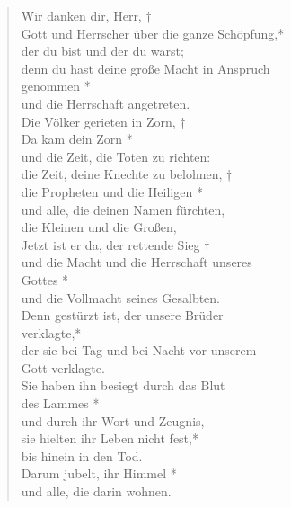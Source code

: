 \vspace{0.3cm}

\def\greinitialformat#1{{\fontsize{40}{40}\selectfont #1}}
\gresetfirstlineaboveinitial{\small \textcolor{red}{Ap 11;12}}{}
\setaboveinitialseparation{0.72mm}




\begin{verse}
 Wir danken dir, Herr, †\\
 Gott und Herrscher über die ganze Schöpfung,*\\
 der du bist und der du warst;\\
 \vin denn du hast deine große Macht in Anspruch\\ \vin  genommen *\\
 \vin und die Herrschaft angetreten. \\
 Die Völker gerieten in Zorn, †\\
 Da kam dein Zorn *\\
 und die Zeit, die Toten zu richten:\\
 \vin die Zeit, deine Knechte zu belohnen, †\\
 \vin die Propheten und die Heiligen *\\
 \vin  und alle, die deinen Namen fürchten, \\ \vin die Kleinen und die Großen, \\

 
 Jetzt ist er da, der rettende Sieg †\\
und die Macht und die Herrschaft unseres\\ Gottes *\\
und die Vollmacht seines Gesalbten.\\

\vin Denn gestürzt ist, der unsere Brüder\\ \vin  verklagte,*\\
\vin der sie bei Tag und bei Nacht vor unserem \\ \vin Gott verklagte.\\
Sie haben ihn besiegt durch das Blut\\ des Lammes *\\
und durch ihr Wort und Zeugnis,\\ 
\vin sie hielten ihr Leben nicht fest,*\\
\vin  bis hinein in den Tod.\\
Darum jubelt, ihr Himmel *\\
und alle, die darin wohnen.\\


\end{verse}


